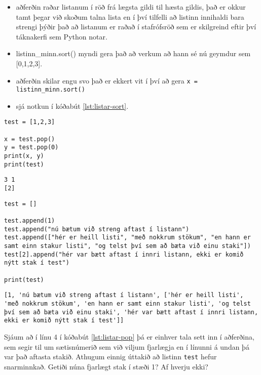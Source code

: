 \begin{itemize}[]
\begin{itemize}
		\item aðferðin raðar listanum í röð frá lægsta gildi til hæsta gildis, það er okkur tamt þegar við skoðum talna lista en í því tilfelli að listinn innihaldi bara strengi þýðir það að listanum er raðað í stafrófsröð sem er skilgreind eftir því táknakerfi sem Python notar.
		\item listinn\_minn.sort() myndi gera það að verkum að hann sé nú geymdur sem [0,1,2,3].
		\item aðferðin skilar engu svo það er ekkert vit í því að gera \texttt{x = listinn\_minn.sort()}
		\item sjá notkun í kóðabút \ref{lst:listar-sort}.
	\end{itemize}
	
\end{itemize}

\begin{lstlisting}[caption=.pop() aðferðin, label=lst:listar-pop]
test = [1,2,3]

x = test.pop()
y = test.pop(0)
print(x, y)
print(test)
\end{lstlisting}
\lstset{style=uttak}
\begin{lstlisting}
3 1
[2]
\end{lstlisting}
\lstset{style=venjulegt}

\begin{lstlisting}[caption=.append() aðferðin, label=lst:listar-append]
test = []

test.append(1)
test.append("nú bætum við streng aftast í listann")
test.append(["hér er heill listi", "með nokkrum stökum", "en hann er samt einn stakur listi", "og telst því sem að bæta við einu staki"])
test[2].append("hér var bætt aftast í innri listann, ekki er komið nýtt stak í test")

print(test)
\end{lstlisting}
\lstset{style=uttak}
\begin{lstlisting}
[1, 'nú bætum við streng aftast í listann', ['hér er heill listi', 'með nokkrum stökum', 'en hann er samt einn stakur listi', 'og telst því sem að bæta við einu staki', 'hér var bætt aftast í innri listann, ekki er komið nýtt stak í test']]
\end{lstlisting}
\lstset{style=venjulegt}

Sjáum að í línu 4 í kóðabút \ref{lst:listar-pop} þá er einhver tala sett inn í aðferðina, sem segir til um sætisnúmerið sem við viljum fjarlægja en í línunni á undan þá var það aftasta stakið.
Athugum einnig úttakið að listinn \texttt{test} hefur snarminnkað.
Getiði núna fjarlægt stak í stæði 1?
Af hverju ekki?

